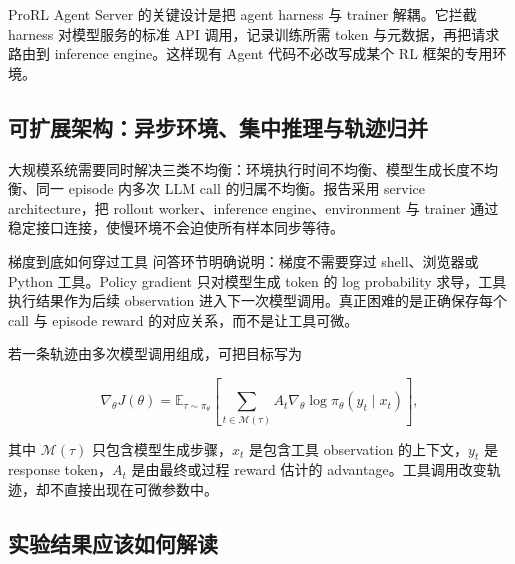 ProRL Agent Server 的关键设计是把 agent harness 与 trainer 解耦。它拦截 harness 对模型服务的标准 API 调用，记录训练所需 token 与元数据，再把请求路由到 inference engine。这样现有 Agent 代码不必改写成某个 RL 框架的专用环境。


\subsection{可扩展架构：异步环境、集中推理与轨迹归并}

大规模系统需要同时解决三类不均衡：环境执行时间不均衡、模型生成长度不均衡、同一 episode 内多次 LLM call 的归属不均衡。报告采用 service architecture，把 rollout worker、inference engine、environment 与 trainer 通过稳定接口连接，使慢环境不会迫使所有样本同步等待。



\begin{importantbox}{梯度到底如何穿过工具}
问答环节明确说明：梯度不需要穿过 shell、浏览器或 Python 工具。Policy gradient 只对模型生成 token 的 log probability 求导，工具执行结果作为后续 observation 进入下一次模型调用。真正困难的是正确保存每个 call 与 episode reward 的对应关系，而不是让工具可微。
\end{importantbox}

若一条轨迹由多次模型调用组成，可把目标写为

$$
\nabla_\theta J(\theta)
=\mathbb{E}_{\tau\sim\pi_\theta}
\left[\sum_{t\in\mathcal{M}(\tau)} A_t\nabla_\theta\log\pi_\theta(y_t\mid x_t)\right],
$$

其中 $\mathcal{M}(\tau)$ 只包含模型生成步骤，$x_t$ 是包含工具 observation 的上下文，$y_t$ 是 response token，$A_t$ 是由最终或过程 reward 估计的 advantage。工具调用改变轨迹，却不直接出现在可微参数中。


\subsection{实验结果应该如何解读}

